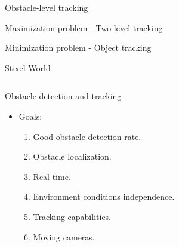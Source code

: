 \begin{frame}[plain]{Obstacle-level tracking}
\begin{overlayarea}{\textwidth}{\textheight}
{\begin{block}{Maximization problem - Two-level tracking}
\begin{center}
      \end{center}
    \end{block}
  }
   {
    \begin{block}{Minimization problem - Object tracking}
      \begin{center}
      \end{center}
    \end{block}
  }
  \end{overlayarea}

  \note {

  }
\end{frame}

\begin{frame}{Stixel World}
  \begin{columns}[c] %
  \end{columns}
\end{frame}

\begin{frame}{Obstacle detection and tracking}
  \begin{itemize}
  \item Goals:
    \begin{enumerate}
      \item Good obstacle detection rate. 
      \item Obstacle localization. \only<3->{\textcolor{green}{\cmark}}
      \item Real time. 
      \item Environment conditions independence. 
      \item Tracking capabilities. 
      \item Moving cameras. 
    \end{enumerate}
  \end{itemize}
\end{frame}